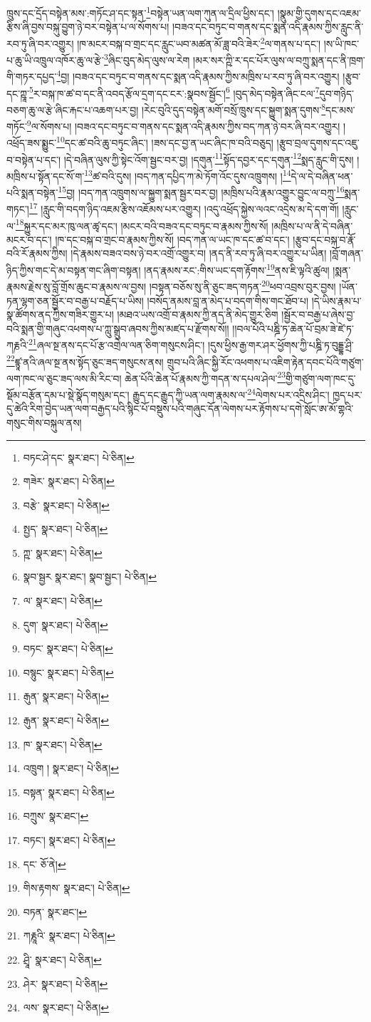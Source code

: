 ཁྲུས་དང་དྲོད་བསྟེན་མས་:གཏོང་ཤ་དང་སྟན་\footnote{བཏང་ཤེ་དང་  སྣར་ཐང་།  པེ་ཅིན། }བསྟེན་ཡན་ལག་ཀུན་ལ་དྲིལ་ཕྱིས་དང་། །སྣུམ་གྱི་དུགས་དང་འཇམ་རྩིས་ཞི་བྱས་བསྐུ་བྱུག་ཉེ་བར་བསྟེན་པ་ལ་སོགས་པ། །བཟའ་དང་བཏུང་བ་གནས་དང་སྨན་འདི་རྣམས་ཀྱིས་རླུང་ནི་རབ་ཏུ་ཞི་བར་འགྱུར། །ཁ་མངར་བསྐ་བ་གྲང་དང་རླུང་ཡབ་མཚན་མོ་ཟླ་བའི་ཟེར་\footnote{གཟེར་  སྣར་ཐང་།  པེ་ཅིན། }ལ་གནས་པ་དང་། །ས་ཡི་ཁང་པ་ཆུ་ཡི་འཁྲུལ་འཁོར་ཆུ་ལ་རྩེ་\footnote{བརྩེ་  སྣར་ཐང་།  པེ་ཅིན། }ཞིང་བུད་མེད་ལུས་ལ་རེག །མར་སར་ཀྵི་ར་དང་པོར་ལུས་ལ་བཀྲུ་སྨན་དང་ནི་ཁྲག་གི་གཏར་དཔྱད་\footnote{སྤྱད་  སྣར་ཐང་།  པེ་ཅིན། }བྱ། །བཟའ་དང་བཏུང་བ་གནས་དང་སྨན་འདི་རྣམས་ཀྱིས་མཁྲིས་པ་རབ་ཏུ་ཞི་བར་འགྱུར། །རྩུབ་དང་ཀྵཱ་\footnote{ཀྵ་  སྣར་ཐང་།  པེ་ཅིན། }ར་བསྐ་ཁ་ཚ་བ་དང་ནི་འབད་རྩོལ་དྲག་དང་ངར་:སྣབས་སྦྱོང་།\footnote{སྣབ་སྦྱར  སྣར་ཐང་། སྣབ་སྦྱང་།  པེ་ཅིན། } །བུད་མེད་བསྟེན་ཞིང་ངལ་\footnote{ལ་  སྣར་ཐང་།  པེ་ཅིན། }དུབ་གཉིད་བཅག་ཆུ་ལ་རྩེ་ཞིང་རྐང་པ་འཆག་པར་བྱ། །རེང་བུའི་དུད་བསྟེན་མགོ་བསྲོ་ཁྲུས་དང་སྐྱུག་སྨན་དུགས་\footnote{དུག་  སྣར་ཐང་།  པེ་ཅིན། }དང་མས་གཏོང་\footnote{བཏང་  སྣར་ཐང་།  པེ་ཅིན། }ལ་སོགས་པ། །བཟའ་དང་བཏུང་བ་གནས་དང་སྨན་འདི་རྣམས་ཀྱིས་བད་ཀན་ཉེ་བར་ཞི་བར་འགྱུར། །འཕྲོད་ཟས་སྨྱུང་\footnote{བསྙུང་  སྣར་ཐང་།  པེ་ཅིན། }དང་ཚ་བའི་ཆུ་བཏུང་ཞིང་། །ཟས་དང་བྱ་ན་ཡང་ཞིང་ཁ་བའི་བཅུད། །རྩུབ་བྲལ་དུགས་དང་འཇུ་བ་བསྟེན་པ་དང་། །དེ་བཞིན་ལུས་ཀྱི་སྟེང་འོག་སྦྱང་བར་བྱ། །དགུན་\footnote{རྒུན་  སྣར་ཐང་།  པེ་ཅིན། }སྟོད་དབྱར་དང་དགུན་\footnote{རྒུན་  སྣར་ཐང་།  པེ་ཅིན། }སྨད་རླུང་གི་དུས། །མཁྲིས་པ་སྟོན་དང་སོ་ག་\footnote{ཁ་  སྣར་ཐང་།  པེ་ཅིན། }ཚ་བའི་དུས། །བད་ཀན་དཔྱིད་ཀ་མེ་ཏོག་འོང་དུས་འཁྲུགས། །\footnote{འཁྲུག །  སྣར་ཐང་།  པེ་ཅིན། }དེ་ལ་དེ་བཞིན་ཕན་པའི་སྨན་བསྟེན་\footnote{བསྟན་  སྣར་ཐང་།  པེ་ཅིན། }བྱ། །བད་ཀན་འཁྲུགས་ལ་སྐྱུག་སྨན་སྦྱར་བར་བྱ། །མཁྲིས་པའི་རྣམ་འགྱུར་བྱུང་ལ་བཀྲུ་\footnote{བཀྲུས་  སྣར་ཐང་། }སྨན་གཏང་།\footnote{བཏང་།  སྣར་ཐང་།  པེ་ཅིན། } །རླུང་གི་བདག་ཉིད་འཇམ་རྩིས་འཇོམས་པར་འགྱུར། །འདུ་འཕྲོད་སྐྱེས་ལའང་འདྲེས་མ་དེ་དག་གོ། །རླུང་ལ་\footnote{དང་  ཅོ་ནེ། }སྐྱུར་དང་མར་ཁུ་ལན་ཚྭ་དང་། །མངར་བའི་བཟའ་དང་བཏུང་བ་རྣམས་ཀྱིས་སོ། །མཁྲིས་པ་ལ་ནི་དེ་བཞིན་མངར་བ་དང་། །ཁ་དང་བསྐ་བ་གྲང་བ་རྣམས་ཀྱིས་སོ། །བད་ཀན་ལ་ཡང་ཁ་དང་ཚ་བ་དང་། །རྩུབ་དང་བསྐ་བ་རྣོ་བའི་རོ་རྣམས་ཀྱིས། །དེ་རྣམས་བཟའ་བས་ཉེ་བར་འགྲོ་འགྱུར་བ། །ནད་ནི་རབ་ཏུ་ཞི་བར་འགྱུར་པ་ཡིན། །བློ་གཞན་ཉིད་ཀྱིས་གང་དེ་མ་བསྟན་གང་ཞིག་བསྟན། །ནད་རྣམས་རང་:གིས་ཡང་དག་རྟོགས་\footnote{གིས་རྟགས་  སྣར་ཐང་།  པེ་ཅིན། }ནས་ཇི་ལྟའི་ཚུལ། །སྨན་རྣམས་རྗེས་སུ་བློ་གྲོས་ཆུང་བ་རྣམས་ལ་བྱས། །བསྟན་བཅོས་སུ་ནི་ཅུང་ཟད་གཏན་\footnote{བཏན་  སྣར་ཐང་། }ཕབ་འབྲས་བུར་བྱས། །ཡོན་ཏན་ལྷག་ཅན་སྦྱོར་བ་བརྒྱ་པ་བརྗོད་པ་ཡིས། །བསོད་ནམས་བླ་ན་མེད་པ་བདག་གིས་གང་ཐོབ་པ། །དེ་ཡིས་རྣམ་པ་སྣ་ཚོགས་ནད་ཀྱིས་གཟིར་གྱུར་པ། །མཐའ་ཡས་འགྲོ་བ་རྣམས་ཀྱི་ནད་ནི་མེད་གྱུར་ཅིག །སྦྱོར་བ་བརྒྱ་པ་ཞེས་བྱ་བའི་སྨན་གྱི་གཞུང་འཕགས་པ་ཀླུ་སྒྲུབ་ཞབས་ཀྱིས་མཛད་པ་རྫོགས་སོ།། །།བལ་པོའི་པཎྜི་ཏ་ཆེན་པོ་བྲམ་ཟེ་ཛེ་ཏ་ཀརྞའི་\footnote{ཀརྞཱའི་  སྣར་ཐང་།  པེ་ཅིན། }ཞལ་སྔ་ནས་དང་པོ་རྩ་འགྲེལ་ལན་ཅིག་གསུངས་ཤིང་། །དུས་ཕྱིས་རྒྱ་གར་ཤར་ཕྱོགས་ཀྱི་པཎྜི་ཏ་བུདྡྷ་ཤྲི་\footnote{ཤྲཱི་  སྣར་ཐང་།  པེ་ཅིན། }ཛྙཱ་ནའི་ཞལ་སྔ་ནས་སྟོད་ཅུང་ཟད་གསུངས་ནས། གྲུབ་པའི་ཞིང་སྐྱི་རོང་འཕགས་པ་འཇིག་རྟེན་དབང་པོའི་གཙུག་ལག་ཁང་ལ་ཅུང་ཟད་ལས་མི་རིང་བ། ཆེན་པོའི་ཆེན་པོ་རྣམས་ཀྱི་གདན་ས་དཔལ་ཤེལ་\footnote{ཤེར་  སྣར་ཐང་།  པེ་ཅིན། }གྱི་གཙུག་ལག་ཁང་དུ་སྡོམ་བརྩོན་དམ་པ་སྡེ་སྣོད་གསུམ་དང་། རྒྱུད་དང་རྒྱུད་ཀྱི་ཡན་ལག་རྣམས་ལ་\footnote{ལས་  སྣར་ཐང་།  པེ་ཅིན། }ལེགས་པར་འདྲིས་ཤིང་། ཁྱད་པར་དུ་ཚེའི་རིག་བྱེད་ཡན་ལག་བརྒྱད་པའི་སྙིང་པོ་བསྡུས་པའི་གཞུང་དོན་ལེགས་པར་རྟོགས་པ་དགེ་སློང་ཨ་མོ་གྷའི་གསུང་གིས་བསྐུལ་ནས། 